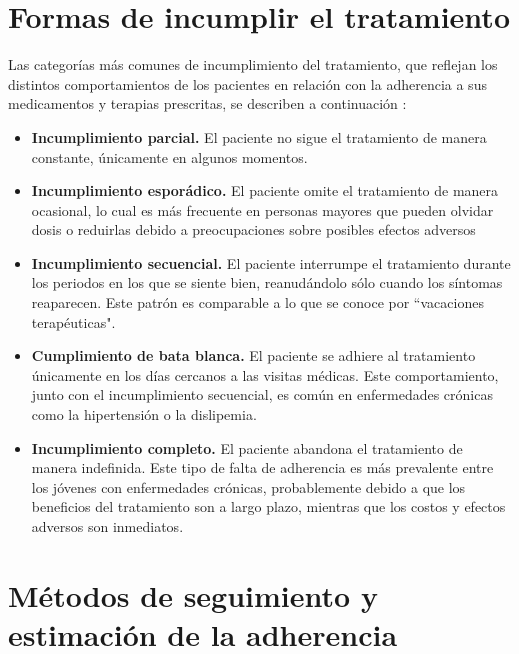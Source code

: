 \section{Formas de incumplir el tratamiento}

Las categorías más comunes de incumplimiento del tratamiento, que reflejan los distintos comportamientos de los pacientes en relación con la adherencia a sus medicamentos y terapias prescritas, se describen a continuación \cite{ibarra2017adherencia}:
\begin{itemize}
	\item \textbf{Incumplimiento parcial.} El paciente no sigue el tratamiento de manera constante, únicamente en algunos momentos.

	\item \textbf{Incumplimiento esporádico.} El paciente omite el tratamiento de manera ocasional, lo cual es más frecuente en personas mayores que pueden olvidar dosis o reduirlas debido a preocupaciones sobre posibles efectos adversos
	
	\item \textbf{Incumplimiento secuencial.} El paciente interrumpe el tratamiento durante los periodos en los que se siente bien, reanudándolo sólo cuando los síntomas reaparecen. Este patrón es comparable a lo que se conoce por ``vacaciones terapéuticas".
	
	\item \textbf{Cumplimiento de bata blanca.} El paciente se adhiere al tratamiento únicamente en los días cercanos a las visitas médicas. Este comportamiento, junto con el incumplimiento secuencial, es común en enfermedades crónicas como la hipertensión o la dislipemia.
	
	\item \textbf{Incumplimiento completo.} El paciente abandona el tratamiento de manera indefinida. Este tipo de falta de adherencia es más prevalente entre los jóvenes con enfermedades crónicas, probablemente debido a que los beneficios del tratamiento son a largo plazo, mientras que los costos y efectos adversos son inmediatos.
	
\end{itemize}

\section{Métodos de seguimiento y estimación de la adherencia}

